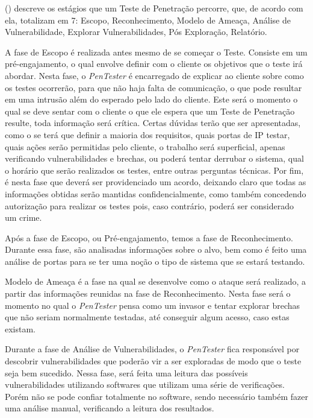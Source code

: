  (\citeyear{handson}) descreve os estágios que um Teste de Penetração percorre, que, de acordo com ela, totalizam em 7: Escopo, Reconhecimento, Modelo de Ameaça, Análise de Vulnerabilidade, Explorar Vulnerabilidades, Pós Exploração, Relatório.

A fase de Escopo é realizada antes mesmo de se começar o Teste. Consiste em um pré-engajamento, o qual envolve definir com o cliente os objetivos que o teste irá abordar. Nesta fase, o {\em PenTester} é encarregado de explicar ao cliente sobre como os testes ocorrerão, para que não haja falta de comunicação, o que pode resultar em uma intrusão além do esperado pelo lado do cliente. Este será o momento o qual se deve sentar com o cliente o que ele espera que um Teste de Penetração resulte, toda informação será crítica. Certas dúvidas terão que ser apresentadas, como o se terá que definir a maioria dos requisitos, quais portas de IP testar, quais ações serão permitidas pelo cliente, o trabalho será superficial, apenas verificando vulnerabilidades e brechas, ou poderá tentar derrubar o sistema, qual o horário que serão realizados os testes, entre outras perguntas técnicas. Por fim, é nesta fase que deverá ser providenciado um acordo, deixando claro que todas as informações obtidas serão mantidas confidencialmente, como também concedendo autorização para realizar os testes pois, caso contrário, poderá ser considerado um crime.

Após a fase de Escopo, ou Pré-engajamento, temos a fase de Reconhecimento. Durante essa fase, são analisadas informações sobre o alvo, bem como é feito uma análise de portas para se ter uma noção o tipo de sistema que se estará testando.

Modelo de Ameaça é a fase na qual se desenvolve como o ataque será realizado, a partir das informações reunidas na fase de Reconhecimento. Nesta fase será o momento no qual o {\em PenTester} pensa como um invasor e tentar explorar brechas que não seriam normalmente testadas, até conseguir algum acesso, caso estas existam.

Durante a fase de Análise de Vulnerabilidades, o {\em PenTester} fica responsável por descobrir vulnerabilidades que poderão vir a ser exploradas de modo que o teste seja bem sucedido. Nessa fase, será feita uma leitura das possíveis vulnerabilidades utilizando softwares que utilizam uma série de verificações. Porém não se pode confiar totalmente no software, sendo necessário também fazer uma análise manual, verificando a leitura dos resultados.

